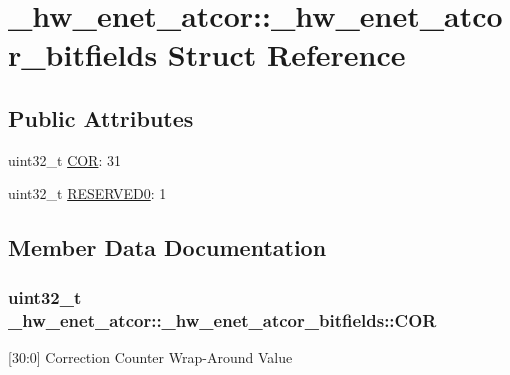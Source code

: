 \hypertarget{struct__hw__enet__atcor_1_1__hw__enet__atcor__bitfields}{}\section{\+\_\+hw\+\_\+enet\+\_\+atcor\+:\+:\+\_\+hw\+\_\+enet\+\_\+atcor\+\_\+bitfields Struct Reference}
\label{struct__hw__enet__atcor_1_1__hw__enet__atcor__bitfields}
\subsection*{Public Attributes}
\begin{DoxyCompactItemize}
\item 
uint32\+\_\+t \hyperlink{struct__hw__enet__atcor_1_1__hw__enet__atcor__bitfields_a4e4a594d772299613c418a177073c76b}{C\+OR}\+: 31
\item 
uint32\+\_\+t \hyperlink{struct__hw__enet__atcor_1_1__hw__enet__atcor__bitfields_a5218e4ad37d16e513a84966532ad63a5}{R\+E\+S\+E\+R\+V\+E\+D0}\+: 1
\end{DoxyCompactItemize}


\subsection{Member Data Documentation}
\subsubsection[{\texorpdfstring{C\+OR}{COR}}]{\setlength{\rightskip}{0pt plus 5cm}uint32\+\_\+t \+\_\+hw\+\_\+enet\+\_\+atcor\+::\+\_\+hw\+\_\+enet\+\_\+atcor\+\_\+bitfields\+::\+C\+OR}\hypertarget{struct__hw__enet__atcor_1_1__hw__enet__atcor__bitfields_a4e4a594d772299613c418a177073c76b}{}\label{struct__hw__enet__atcor_1_1__hw__enet__atcor__bitfields_a4e4a594d772299613c418a177073c76b}
\mbox{[}30\+:0\mbox{]} Correction Counter Wrap-\/\+Around Value 
